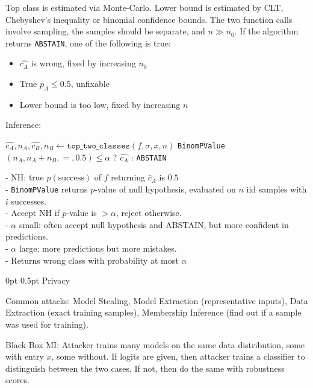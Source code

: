 \documentclass[11pt,landscape,a4paper,fleqn]{article}
\makeatletter
\renewcommand{\section}{\@startsection{section}{1}{0mm}%
                                {0pt}%
                                {0.5pt}%
                                {\color{myorange}\sffamily\small\bfseries}}
\makeatother
\begin{document}
\begin{multicols*}{4}
Top class is estimated via Monte-Carlo.
Lower bound is estimated by CLT, Chebyshev's inequality or binomial confidence bounds.
The two function calls involve sampling, the samples should be separate, and \(n \gg n_0\).
If the algorithm returns \texttt{ABSTAIN}, one of the following is true:
\begin{itemize}
    \item \(\hat{c_A}\) is wrong, fixed by increasing \(n_0\) 
    \item True \(p_A \leq 0.5\), unfixable
    \item Lower bound is too low, fixed by increasing \(n\)
\end{itemize}

Inference:
\vspace*{-1mm}
\begin{algorithmic}
\State \(\hat{c_A}, n_A, \hat{c_B}, n_B \gets \texttt{top\_two\_classes}(f, \sigma, x, n)\)
\State \Return \texttt{BinomPValue}\((n_A, n_A + n_B, = , 0.5) \leq \alpha\) ? \(\hat{c_A}\) : \texttt{ABSTAIN}
\end{algorithmic}
\vspace*{-1mm}

- NH: true \(p(\mathrm{success})\) of $f$ returning $\hat{c}_A$ is $0.5$ \\
- \texttt{BinomPValue} returns $p$-value of null hypothesis, evaluated on $n$ iid samples with $i$ successes.\\
- Accept NH if $p$-value is $> \alpha$, reject otherwise.\\
- $\alpha$ small: often accept null hypothesis and ABSTAIN, but more confident in predictions.\\
- $\alpha$ large: more predictions but more mistakes.\\
- Returns wrong class with probability at most $\alpha$

\section{Privacy}

Common attacks: Model Stealing, Model Extraction (representative inputs),
Data Extraction (exact training samples), Membership Inference (find out if a sample was used for training).

Black-Box MI: Attacker trains many models on the same data distribution, some with entry \(x\), some without.
If logits are given, then attacker trains a classifier to distinguish between the two cases.
If not, then do the same with robustness scores.


\end{multicols*}
\end{document}
